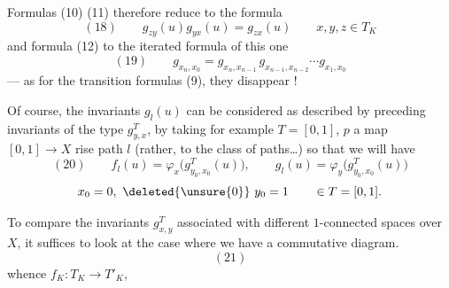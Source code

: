 Formulas (10) (11) therefore reduce to the formula
\[
(18)\qquad g_{zy}(u)g_{yx}(u)=g_{zx}(u)\qquad x,y,z\in T_K
\]
and formula (12) to the iterated formula of this one
\[
(19)\qquad g_{x_n,x_0}=g_{x_n,x_{n-1}}\,g_{x_{n-1},x_{n-2}}\cdots g_{x_1,x_0}
\]
--- as for the transition formulas (9), they  disappear !

Of course, the invariants $g_l(u)$  can be considered as described by preceding invariants of the type $g_{y,x}^T$, by taking  for example $T=[0,1]$, $p$ a map $[0,1]\longrightarrow X$  rise  path $l$ (rather, to the class of paths\ldots) so that we will have
\[
(20)\qquad f_l(u)=\varphi_x\bigl(g_{y_0,x_0}^T(u)\bigr),\qquad g_l(u)=\varphi_y\bigl(g_{y_0,x_0}^T(u)\bigr)
\]
\[
x_0=0,\ \deleted{\unsure{0}}\ y_0=1\qquad\in T=[0,1].
\]

To compare the invariants $g_{x,y}^T$ associated with different $1$-connected spaces over $X$, it suffices to look at the case where we have a commutative diagram.
\[
(21)
\]
whence $f_K:T_K\longrightarrow T'_K$,
